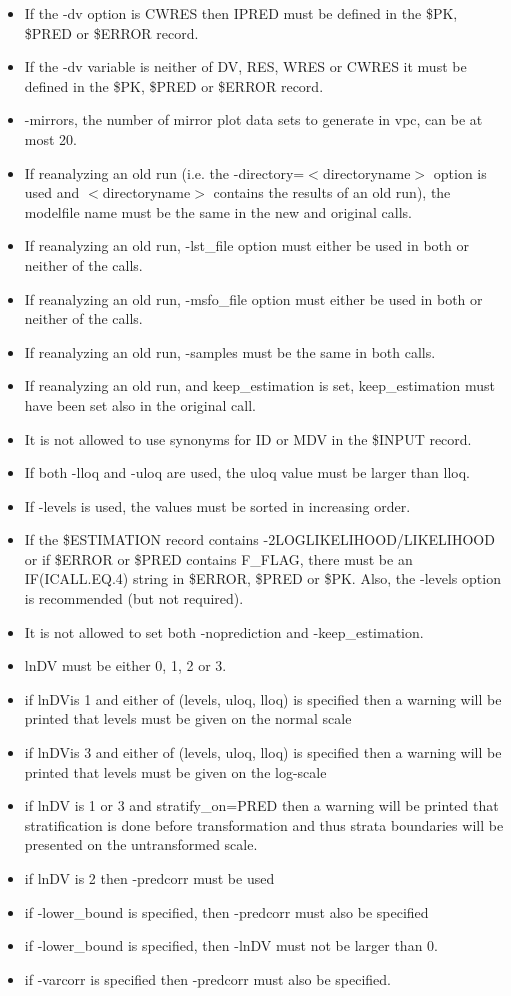 \begin{itemize}
	\item If the -dv option is CWRES then IPRED must be defined in the \$PK, \$PRED or \$ERROR record.
	\item If the -dv variable is neither of DV, RES, WRES or CWRES it must be defined in the \$PK, \$PRED or \$ERROR record. 
	\item -mirrors, the number of mirror plot data sets to generate in vpc, can be at most 20.
	\item If reanalyzing an old run (i.e. the -directory=$<$directoryname$>$ option is used and $<$directoryname$>$ contains the results of an old run), the modelfile name must be the same in the new and original calls.
	\item If reanalyzing an old run, -lst\_file option must either be used in both or neither of the calls.
	\item If reanalyzing an old run, -msfo\_file option must either be used in both or neither of the calls.
	\item If reanalyzing an old run, -samples must be the same in both calls.
	\item If reanalyzing an old run, and keep\_estimation is set, keep\_estimation must have been set also in the original call.
	\item It is not allowed to use synonyms for ID or MDV in the \$INPUT record.
	\item If both -lloq and -uloq are used, the uloq value must be larger than lloq.
	\item If -levels is used, the values must be sorted in increasing order.
	\item If the \$ESTIMATION record contains -2LOGLIKELIHOOD/LIKELIHOOD or if \$ERROR or \$PRED contains F\_FLAG, there must be an IF(ICALL.EQ.4) string in \$ERROR, \$PRED or \$PK. Also, the -levels option is recommended (but not required). 
	\item It is not allowed to set both -noprediction and -keep\_estimation.
	\item lnDV must be either 0, 1, 2 or 3.
	\item if lnDVis 1 and either of (levels, uloq, lloq) is specified then a warning will be printed that levels must be given on the normal scale
	\item if lnDVis 3 and either of (levels, uloq, lloq) is specified then a warning will be printed that levels must be given on the log-scale
	\item if lnDV is 1 or 3 and stratify\_on=PRED then a warning will be printed that stratification is done before transformation and thus strata boundaries will be presented on the untransformed scale.
	\item if lnDV is 2 then -predcorr must be used 
	\item if -lower\_bound is specified, then -predcorr must also be specified
	\item if -lower\_bound is specified, then -lnDV must not be larger than 0.
	\item if -varcorr is specified then -predcorr must also be specified.
\end{itemize}

